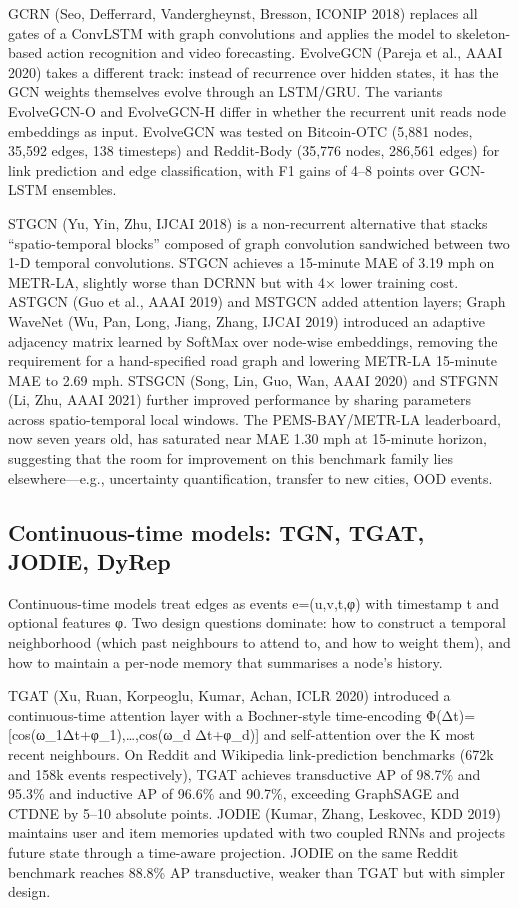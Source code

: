 GCRN (Seo, Defferrard, Vandergheynst, Bresson, ICONIP 2018) replaces all gates of a ConvLSTM with graph convolutions and applies the model to skeleton-based action recognition and video forecasting. EvolveGCN (Pareja et al., AAAI 2020) takes a different track: instead of recurrence over hidden states, it has the GCN weights themselves evolve through an LSTM/GRU. The variants EvolveGCN-O and EvolveGCN-H differ in whether the recurrent unit reads node embeddings as input. EvolveGCN was tested on Bitcoin-OTC (5,881 nodes, 35,592 edges, 138 timesteps) and Reddit-Body (35,776 nodes, 286,561 edges) for link prediction and edge classification, with F1 gains of 4--8 points over GCN-LSTM ensembles.

STGCN (Yu, Yin, Zhu, IJCAI 2018) is a non-recurrent alternative that stacks ``spatio-temporal blocks'' composed of graph convolution sandwiched between two 1-D temporal convolutions. STGCN achieves a 15-minute MAE of 3.19 mph on METR-LA, slightly worse than DCRNN but with 4× lower training cost. ASTGCN (Guo et al., AAAI 2019) and MSTGCN added attention layers; Graph WaveNet (Wu, Pan, Long, Jiang, Zhang, IJCAI 2019) introduced an adaptive adjacency matrix learned by SoftMax over node-wise embeddings, removing the requirement for a hand-specified road graph and lowering METR-LA 15-minute MAE to 2.69 mph. STSGCN (Song, Lin, Guo, Wan, AAAI 2020) and STFGNN (Li, Zhu, AAAI 2021) further improved performance by sharing parameters across spatio-temporal local windows. The PEMS-BAY/METR-LA leaderboard, now seven years old, has saturated near MAE 1.30 mph at 15-minute horizon, suggesting that the room for improvement on this benchmark family lies elsewhere---e.g., uncertainty quantification, transfer to new cities, OOD events.

\subsection{Continuous-time models: TGN, TGAT, JODIE, DyRep}\label{continuous-time-models-tgn-tgat-jodie-dyrep}

Continuous-time models treat edges as events e=(u,v,t,φ) with timestamp t and optional features φ. Two design questions dominate: how to construct a temporal neighborhood (which past neighbours to attend to, and how to weight them), and how to maintain a per-node memory that summarises a node's history.

TGAT (Xu, Ruan, Korpeoglu, Kumar, Achan, ICLR 2020) introduced a continuous-time attention layer with a Bochner-style time-encoding Φ(Δt)={[}cos(ω\_1Δt+φ\_1),\ldots,cos(ω\_d Δt+φ\_d){]} and self-attention over the K most recent neighbours. On Reddit and Wikipedia link-prediction benchmarks (672k and 158k events respectively), TGAT achieves transductive AP of 98.7\% and 95.3\% and inductive AP of 96.6\% and 90.7\%, exceeding GraphSAGE and CTDNE by 5--10 absolute points. JODIE (Kumar, Zhang, Leskovec, KDD 2019) maintains user and item memories updated with two coupled RNNs and projects future state through a time-aware projection. JODIE on the same Reddit benchmark reaches 88.8\% AP transductive, weaker than TGAT but with simpler design.

